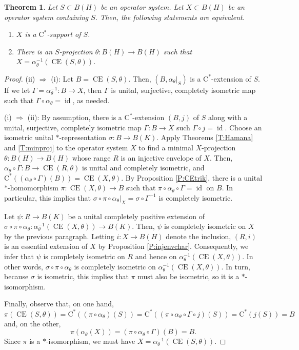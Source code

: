 \documentclass[10pt]{amsart}
\newcommand{\rC}{\mathrm{C}}
\newcommand{\CE}{\operatorname{CE}}
\newcommand{\id}{\operatorname{id}}
\newtheorem{theorem}[lemma]{Theorem}
\theoremstyle{definition}
\begin{document}
\begin{theorem}\label{T:Cstarext}
Let $S\subset B(H)$  be an operator system. Let $X\subset B(H)$ be an operator system containing $S$. Then, the following statements are equivalent.
\begin{enumerate}[{\rm (i)}]
\item $X$ is a $\rC^*$-support of $S$.
\item There is an $S$-projection $\theta:B(H)\to B(H)$ such that  $X=\alpha_\theta^{-1}(\CE(S,\theta))$.
\end{enumerate}
\end{theorem} 
\begin{proof}

(ii) $\Rightarrow$ (i):  Let $B=\CE(S,\theta)$. Then, $(B,\alpha_\theta|_S)$ is a $\rC^*$-extension of $S$. If we let $\Gamma=\alpha_\theta^{-1}:B\to X$, then $\Gamma$ is  unital, surjective, completely isometric map such that $\Gamma \circ \alpha_\theta=\id$, as needed.


(i) $\Rightarrow$ (ii):  By assumption, there is a $\rC^*$-extension $(B,j)$ of $S$ along with a unital, surjective, completely isometric map $\Gamma:B\to X$ such $\Gamma\circ j=\id$. Choose an isometric unital $*$-representation $\sigma:B\to B(K)$. Apply Theorems \ref{T:Hamana} and \ref{T:minproj} to the operator system $X$ to find a minimal $X$-projection $\theta:B(H)\to B(H)$ whose range $R$ is an injective envelope of $X$.  Then,  $\alpha_\theta\circ \Gamma:B\to \CE(R,\theta)$ is unital and completely isometric, and $\rC^*((\alpha_\theta\circ \Gamma)(B))=\CE(X,\theta)$. By Proposition \ref{P:CEtrik}, there is a unital $*$-homomorphism $\pi:\CE(X,\theta)\to B$ such that $\pi\circ\alpha_\theta\circ \Gamma=\id$ on $B$. In particular, this implies that $\sigma\circ \pi\circ \alpha_\theta|_X=\sigma\circ \Gamma^{-1}$ is completely isometric. 

Let $\psi:R\to B(K)$ be a unital completely positive extension of $\sigma\circ \pi\circ\alpha_\theta:\alpha_\theta^{-1}(\CE(X,\theta))\to B(K)$. Then, $\psi$ is completely isometric on $X$ by the previous paragraph. Letting $i:X\to B(H)$ denote the inclusion, $(R,i)$ is an essential extension of $X$ by Proposition \ref{P:injenvchar}. Consequently, we infer that $\psi$ is completely isometric on $R$ and hence  on $\alpha_\theta^{-1}(\CE(X,\theta))$. In other words, $\sigma\circ \pi\circ\alpha_\theta$ is completely isometric on $ \alpha_\theta^{-1}(\CE(X,\theta))$. In turn, because $\sigma$ is isometric, this implies that $\pi$ must also be  isometric, so it is a $*$-isomorphism. 

Finally, observe that, on one hand, 
\[
\pi(\CE(S,\theta))=\rC^*((\pi \circ \alpha_\theta)(S))=\rC^*((\pi\circ\alpha_\theta\circ \Gamma \circ j)(S))=\rC^*(j(S))=B
\]
and, on the other,
\[
\pi(\alpha_\theta(X))=(\pi\circ \alpha_\theta\circ  \Gamma)(B)=B.
\]
Since $\pi$ is a $*$-isomorphism, we must have $X=\alpha_\theta^{-1}(\CE(S,\theta))$.
\end{proof}
\end{document}
